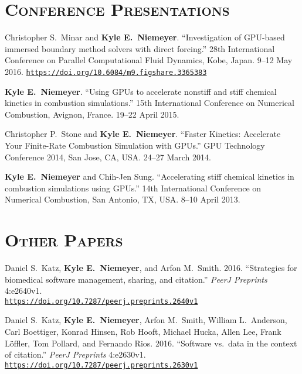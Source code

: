 \documentclass[margin,line,11pt]{res}
\makeatletter
\newlength{\bibhang}
\newlength{\bibsep}
 {\@listi \global\bibsep\itemsep \global\advance\bibsep by\parsep}
\newenvironment{bibenum*}
  {\renewcommand\labelenumi{\theenumi.}%
   \etaremune[
     topsep=0pt,
     itemsep=\bibsep,
     parsep=0pt,partopsep=0pt,
     itemindent=-\bibhang,
     leftmargin={\bibhang+\widthof{[999]}}]}
  {\endetaremune}
\newcommand*{\doi}[1]{\href{https://doi.org/#1}{\nolinkurl{https://doi.org/#1}}}
\makeatother
\begin{document}
\begin{resume}
\section{\textsc{Conference Presentations}}

\begin{bibenum*}

\item Christopher S.\ Minar and \textbf{Kyle E.\ Niemeyer}. ``Investigation of GPU-based immersed boundary method solvers with direct forcing.''
28th International Conference on Parallel Computational Fluid Dynamics, Kobe, Japan.
9--12 May 2016.
\doi{10.6084/m9.figshare.3365383}

\item \textbf{Kyle E.\ Niemeyer}.
``Using GPUs to accelerate nonstiff and stiff chemical kinetics in combustion simulations.''
15th International Conference on Numerical Combustion, Avignon, France.
19--22 April 2015.

\item Christopher P.\ Stone and \textbf{Kyle E.\ Niemeyer}.
``Faster Kinetics: Accelerate Your Finite-Rate Combustion Simulation with GPUs.''
GPU Technology Conference 2014, San Jose, CA, USA.
24--27 March 2014.

\item \textbf{Kyle E.\ Niemeyer} and Chih-Jen Sung.
``Accelerating stiff chemical kinetics in combustion simulations using GPUs.''
14th International Conference on Numerical Combustion, San Antonio, TX, USA.
8--10 April 2013.

\end{bibenum*}

\section{\textsc{Other Papers}}

\begin{bibenum*}

\item Daniel S.\ Katz, \textbf{Kyle E.\ Niemeyer}, and Arfon M.\ Smith.
2016.
``Strategies for biomedical software management, sharing, and citation.''
\textit{PeerJ Preprints} 4:e2640v1. \\
\doi{10.7287/peerj.preprints.2640v1}

\item Daniel S.\ Katz, \textbf{Kyle E.\ Niemeyer}, Arfon M.\ Smith, William L.\ Anderson,
Carl Boettiger, Konrad Hinsen, Rob Hooft, Michael Hucka, Allen Lee, Frank Löffler,
Tom Pollard, and Fernando Rios.
2016.
``Software vs.\ data in the context of citation.''
\textit{PeerJ Preprints} 4:e2630v1.
\doi{10.7287/peerj.preprints.2630v1}


\end{bibenum*}
\end{resume}
\end{document}

